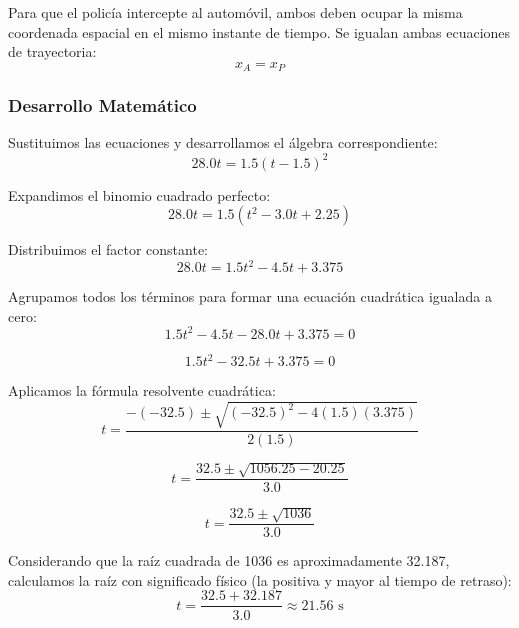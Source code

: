 \documentclass[12pt, a4paper]{article}
\begin{document}
Para que el policía intercepte al automóvil, ambos deben ocupar la misma coordenada espacial en el mismo instante de tiempo. Se igualan ambas ecuaciones de trayectoria:
\begin{equation}
x_A = x_P
\end{equation}

\subsubsection*{Desarrollo Matemático}

Sustituimos las ecuaciones y desarrollamos el álgebra correspondiente:
\begin{equation}
28.0t = 1.5(t - 1.5)^2
\end{equation}

Expandimos el binomio cuadrado perfecto:
\begin{equation}
28.0t = 1.5(t^2 - 3.0t + 2.25)
\end{equation}

Distribuimos el factor constante:
\begin{equation}
28.0t = 1.5t^2 - 4.5t + 3.375
\end{equation}

Agrupamos todos los términos para formar una ecuación cuadrática igualada a cero:
\begin{equation}
1.5t^2 - 4.5t - 28.0t + 3.375 = 0
\end{equation}

\begin{equation}
1.5t^2 - 32.5t + 3.375 = 0
\end{equation}

Aplicamos la fórmula resolvente cuadrática:
\begin{equation}
t = \frac{-(-32.5) \pm \sqrt{(-32.5)^2 - 4(1.5)(3.375)}}{2(1.5)}
\end{equation}

\begin{equation}
t = \frac{32.5 \pm \sqrt{1056.25 - 20.25}}{3.0}
\end{equation}

\begin{equation}
t = \frac{32.5 \pm \sqrt{1036}}{3.0}
\end{equation}

Considerando que la raíz cuadrada de 1036 es aproximadamente 32.187, calculamos la raíz con significado físico (la positiva y mayor al tiempo de retraso):
\begin{equation}
t = \frac{32.5 + 32.187}{3.0} \approx 21.56 \text{ s}
\end{equation}
\end{document}
